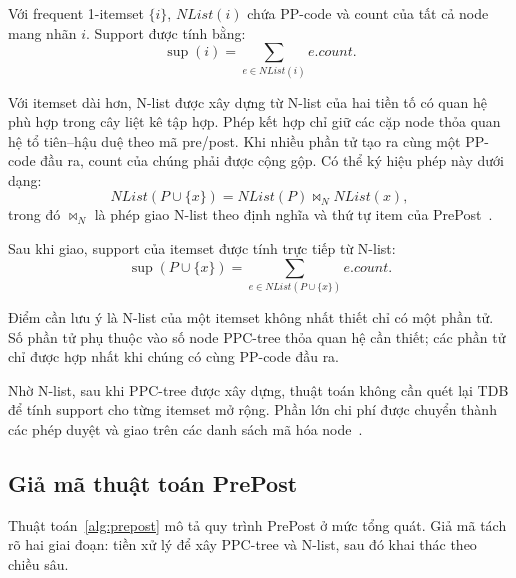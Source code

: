 Với frequent 1-itemset $\{i\}$, $NList(i)$ chứa PP-code và count của tất cả node
mang nhãn $i$. Support được tính bằng:
\begin{equation}
    \operatorname{sup}(i)
    =
    \sum_{e \in NList(i)} e.count.
    \label{eq:nlist-single-support}
\end{equation}

Với itemset dài hơn, N-list được xây dựng từ N-list của hai tiền tố có quan hệ
phù hợp trong cây liệt kê tập hợp. Phép kết hợp chỉ giữ các cặp node thỏa quan
hệ tổ tiên--hậu duệ theo mã pre/post. Khi nhiều phần tử tạo ra cùng một PP-code
đầu ra, count của chúng phải được cộng gộp. Có thể ký hiệu phép này dưới dạng:
\begin{equation}
    NList(P \cup \{x\})
    =
    NList(P) \bowtie_N NList(x),
    \label{eq:nlist-join}
\end{equation}
trong đó $\bowtie_N$ là phép giao N-list theo định nghĩa và thứ tự item của
PrePost~\cite{deng2012prepost}.

Sau khi giao, support của itemset được tính trực tiếp từ N-list:
\begin{equation}
    \operatorname{sup}(P \cup \{x\})
    =
    \sum_{e \in NList(P \cup \{x\})} e.count.
    \label{eq:nlist-itemset-support}
\end{equation}

Điểm cần lưu ý là N-list của một itemset không nhất thiết chỉ có một phần tử.
Số phần tử phụ thuộc vào số node PPC-tree thỏa quan hệ cần thiết; các phần tử
chỉ được hợp nhất khi chúng có cùng PP-code đầu ra.

Nhờ N-list, sau khi PPC-tree được xây dựng, thuật toán không cần quét lại TDB để
tính support cho từng itemset mở rộng. Phần lớn chi phí được chuyển thành các
phép duyệt và giao trên các danh sách mã hóa node~\cite{deng2012prepost}.

\subsection{Giả mã thuật toán PrePost}

Thuật toán~\ref{alg:prepost} mô tả quy trình PrePost ở mức tổng quát. Giả mã
tách rõ hai giai đoạn: tiền xử lý để xây PPC-tree và N-list, sau đó khai thác
theo chiều sâu.

